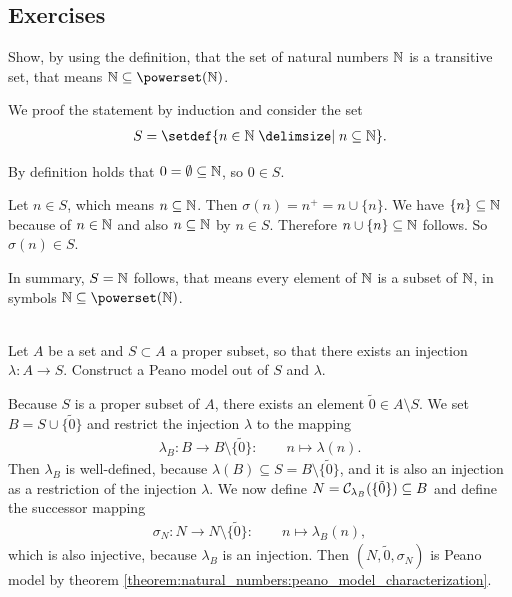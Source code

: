 \subsection{Exercises}

\begin{exercise}\label{exercise:natural_numbers:transient}
    Show, by using the definition, that the set of natural numbers $\mathbb{N}$ is a transitive set, that means $\setN\subseteq\powerset(\setN)$.
\end{exercise}
\begin{solution}
    We proof the statement by induction and consider the set
    \begin{align}S=\setdef{n\in\setN\given n\subseteq\setN}.\end{align}

     By definition holds that $0=\emptyset\subseteq\mathbb{N}$, so $0\in S$.

     Let $n\in S$, which means $n\subseteq\mathbb{N}$. Then $\sigma(n)=n^+=n\cup\{n\}$. We have $\{n\}\subseteq\mathbb{N}$ because of $n\in\mathbb{N}$ and also $n\subseteq\mathbb{N}$ by $n\in S$. Therefore $n\cup\{n\}\subseteq\mathbb{N}$ follows. So $\sigma(n)\in S$.

    In summary, $S=\mathbb{N}$ follows, that means every element of $\mathbb{N}$ is a subset of $\mathbb{N}$, in symbols $\setN\subseteq\powerset(\setN)$.
\end{solution}


\begin{exercise}\label{exercise:natural_numbers:dedekind_construction}~\\ Let $A$ be a set and $S\subset A$ a proper subset, so that there exists an injection $\lambda\colon A\to S$. Construct a Peano model out of $S$ and $\lambda$.
\end{exercise}

\begin{solution}
    Because $S$ is a proper subset of $A$, there exists an element $\tilde 0\in A\setminus S$. We set $B=S\cup\{\tilde 0\}$ and restrict the injection $\lambda$ to the mapping
    \begin{align}\lambda_B\colon B\to B\setminus\{\tilde 0\}\colon\qquad n\mapsto \lambda(n).\end{align}
    Then $\lambda_B$ is well-defined, because $\lambda(B)\subseteq S=B\setminus\{\tilde 0\}$, and it is also an injection as a restriction of the injection $\lambda$. We now define $N=\mathcal C_{\lambda_B}(\{\tilde 0\})\subseteq B$ and define the successor mapping
    \begin{align}\sigma_N\colon N\to N\setminus\{\tilde 0\}\colon\qquad n\mapsto \lambda_B(n),\end{align}
    which is also injective, because $\lambda_B$ is an injection. Then $(N,\tilde 0,\sigma_N)$ is Peano model by theorem \ref{theorem:natural_numbers:peano_model_characterization}.
\end{solution}
